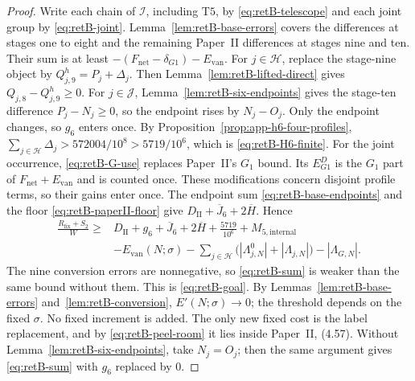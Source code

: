 \begin{proof}
Write each chain of $\mathcal I$, including $\mathrm{T5}$, by
\eqref{eq:retB-telescope} and each joint group by \eqref{eq:retB-joint}. Lemma~\ref{lem:retB-base-errors} covers the
differences at stages one to eight and the remaining Paper~II differences at
stages nine and ten. Their sum is at least $-(F_{\mathrm{net}}-\delta_{G1})-E_{\mathrm{van}}$.
For $j\in\mathcal H$, replace the stage-nine object by $Q^h_{j,9}=P_j+\Delta_j$.
Then Lemma~\ref{lem:retB-lifted-direct} gives $Q_{j,8}-Q^h_{j,9}\ge0$.
For $j\in\mathcal J$, Lemma~\ref{lem:retB-six-endpoints} gives the
stage-ten difference $P_j-N_j\ge0$, so the endpoint rises by $N_j-O_j$.
Only the endpoint changes, so $g_6$ enters once.
By Proposition~\ref{prop:app-h6-four-profiles},
$\sum_{j\in\mathcal H}\Delta_j>572004/10^8>5719/10^6$, which is
\eqref{eq:retB-H6-finite}.
For the joint occurrence, \eqref{eq:retB-G-use} replaces Paper~II's $G_1$
bound. Its $E^D_{G1}$ is the $G_1$ part of $F_{\mathrm{net}}+E_{\mathrm{van}}$
and is counted once.
These modifications concern disjoint profile terms, so their gains enter once.
The endpoint sum \eqref{eq:retB-base-endpoints} and the floor
\eqref{eq:retB-paperII-floor} give $D_{\mathrm{II}}+\overline J_6+2\overline H$.
Hence
\begin{equation}\label{eq:retB-sum}
\begin{aligned}
 \frac{R_{\mathrm{fix}}+S_2}{W}
 \ge{}&D_{\mathrm{II}}+g_6+\overline J_6+2\overline H
      +\frac{5719}{10^6}+M_{5,\mathrm{internal}}\\
 &-E_{\mathrm{van}}(N;\sigma)
      -\sum_{j\in\mathcal H}
          \bigl(|\Lambda^0_{j,N}|+|\Lambda_{j,N}|\bigr)-|\Lambda_{G,N}|.
\end{aligned}
\end{equation}
The nine conversion errors are nonnegative, so \eqref{eq:retB-sum} is weaker
than the same bound without them. This is \eqref{eq:retB-goal}.
By Lemmas~\ref{lem:retB-base-errors} and~\ref{lem:retB-conversion},
$E'(N;\sigma)\to0$; the threshold depends on the fixed $\sigma$.
No fixed increment is added. The only new fixed cost is the label
replacement, and by \eqref{eq:retB-peel-room} it lies inside Paper~II, (4.57).
Without Lemma~\ref{lem:retB-six-endpoints}, take $N_j=O_j$; then the
same argument gives \eqref{eq:retB-sum} with $g_6$ replaced by $0$.
\end{proof}

